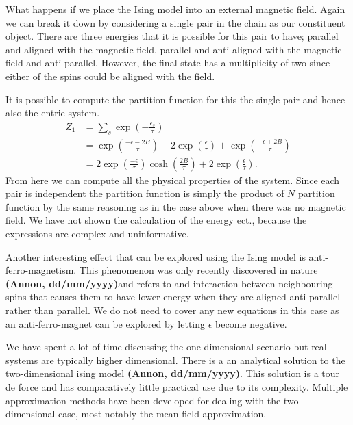 \documentclass[a4paper, twocolumn]{article}
\def\citation{{\bfseries (Annon, dd/mm/yyyy)}}
\begin{document}
What happens if we place the Ising model into an external magnetic %
field. Again we can break it down by considering a single pair %
in the chain as our constituent object. There are three energies %
that it is possible for this pair to have; parallel and aligned %
with the magnetic field, parallel and anti-aligned with the %
magnetic field and anti-parallel. However, the final state has a %
multiplicity of two since either of the spins could be aligned %
with the field. 


It is possible to compute the partition function for this the single %
pair and hence also the entrie system.
%
\begin{align}
Z_{1} &= \sum_{s}\exp\left(-\frac{\epsilon_{s}}{\tau}\right)
        \nonumber\\
    &= \exp\left(\frac{-\epsilon - 2B}{\tau}\right) +
        2\exp\left(\frac{\epsilon}{\tau}\right) +
        \exp\left(\frac{-\epsilon + 2B}{\tau}\right)
        \nonumber\\
    &= 2\exp\left(\frac{-\epsilon}{\tau}\right)
        \cosh\left(\frac{2B}{\tau}\right) + 
        2\exp\left(\frac{\epsilon}{\tau}\right).
\label{eqn:14}
\end{align}
%
From here we can compute all the physical properties of the system. %
Since each pair is independent the partition function is simply the %
product of \(N\) partition function by the same reasoning as in %
the case above when there was no magnetic field. We have not shown %
the calculation of the energy ect., because the expressions are %
complex and uninformative. 


Another interesting effect that can be explored using the Ising model %
is anti-ferro-magnetism. This phenomenon was only recently discovered %
in nature \citation and refers to and interaction between neighbouring %
spins that causes them to have lower energy when they are aligned %
anti-parallel rather than parallel. We do not need to cover any new %
equations in this case as an anti-ferro-magnet can be explored by %
letting \(\epsilon\) become negative. 


We have spent a lot of time discussing the one-dimensional scenario %
but real systems are typically higher dimensional. There is a %
an analytical solution to the two-dimensional ising model \citation. %
This solution is a tour de force and has comparatively little %
practical use due to its complexity. Multiple approximation methods %
have been developed for dealing with the two-dimensional case, %
most notably the mean field approximation. 
\end{document}
